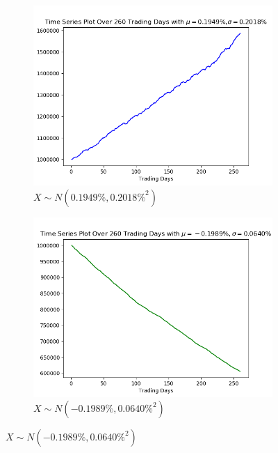 \documentclass[12pt]{article}
\begin{document}
\begin{figure}[h]
	\centering
	\begin{subfigure}{.5\textwidth}
		\centering
		\includegraphics[width=.9\linewidth]{11plot}
		\caption{$X\sim N(0.1949\%,0.2018\%^2)$}
		\label{fig:sub1}
	\end{subfigure}%
	\begin{subfigure}{.5\textwidth}
		\centering
		\includegraphics[width=.9\linewidth]{12plot}
		\caption{$X\sim N(-0.1989\%,0.0640\%^2)$}
		\label{fig:sub2}
	\end{subfigure}

	\label{fig:test}
\end{figure}
\end{document}

